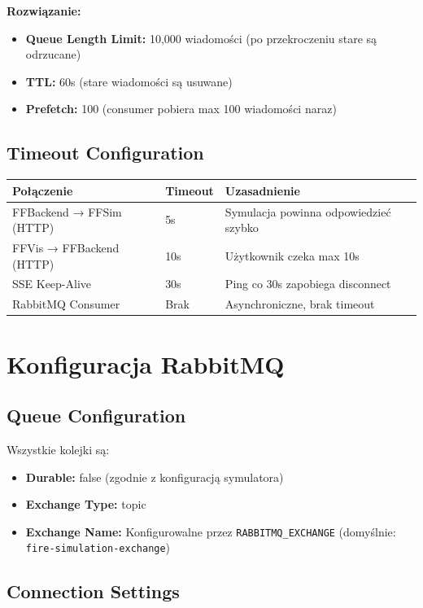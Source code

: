 \documentclass[11pt,a4paper] {article}
\begin{document}
\textbf{Rozwiązanie:}
\begin{itemize}
    \item \textbf{Queue Length Limit:} 10,000 wiadomości (po przekroczeniu stare są odrzucane)
    \item \textbf{TTL:} 60s (stare wiadomości są usuwane)
    \item \textbf{Prefetch:} 100 (consumer pobiera max 100 wiadomości naraz)
\end{itemize}

\subsection{Timeout Configuration}

\begin{longtable}{|l|l|p{5cm}|}
\hline
\textbf{Połączenie} & \textbf{Timeout} & \textbf{Uzasadnienie} \\
\hline
FFBackend → FFSim (HTTP) & 5s & Symulacja powinna odpowiedzieć szybko \\
\hline
FFVis → FFBackend (HTTP) & 10s & Użytkownik czeka max 10s \\
\hline
SSE Keep-Alive & 30s & Ping co 30s zapobiega disconnect \\
\hline
RabbitMQ Consumer & Brak & Asynchroniczne, brak timeout \\
\hline
\end{longtable}

\section{Konfiguracja RabbitMQ}

\subsection{Queue Configuration}

Wszystkie kolejki są:
\begin{itemize}
    \item \textbf{Durable:} false (zgodnie z konfiguracją symulatora)
    \item \textbf{Exchange Type:} topic
    \item \textbf{Exchange Name:} Konfigurowalne przez \texttt{RABBITMQ\_EXCHANGE} (domyślnie: \texttt{fire-simulation-exchange})
\end{itemize}

\subsection{Connection Settings}
\end{document}
